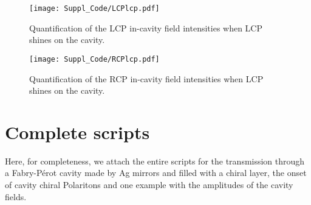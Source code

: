 \documentclass[showpacs,aps,prl,onecolumn,superscriptaddress]{revtex4-1}
\begin{document}
\begin{figure}[H]
\begin{center}
\texttt{[image: Suppl\_Code/LCPlcp.pdf]}
\end{center}
\caption{Quantification of the LCP in-cavity field intensities when LCP shines on the cavity.}
\label{LCPlcp}
\end{figure}
\begin{figure}[H]
\begin{center}
\texttt{[image: Suppl\_Code/RCPlcp.pdf]}
\end{center}
\caption{Quantification of the RCP in-cavity field intensities when LCP shines on the cavity.}
\label{RCPlcp}
\end{figure}
\section{Complete scripts}
Here, for completeness, we attach the entire scripts for the transmission through a  Fabry-P\'erot cavity made by Ag mirrors and filled with a chiral layer, the onset of cavity chiral Polaritons and one example with the amplitudes of the cavity fields.
\end{document}
